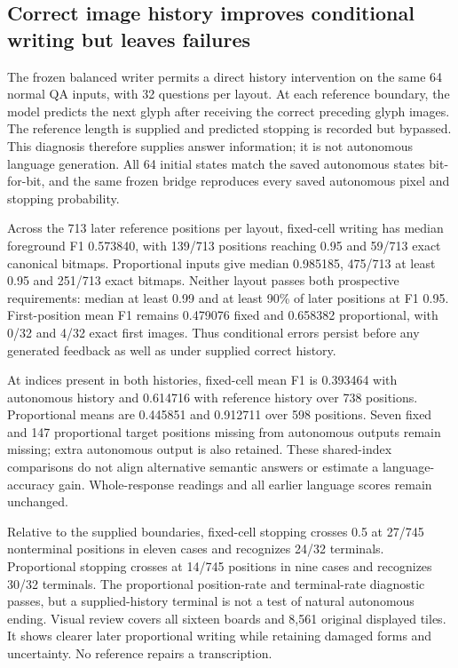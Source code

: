 \documentclass[12pt,a4paper]{article}
\providecommand{\DIFadd}[1]{{\protect\color{blue} \sf #1}} %
\begin{document}
\subsection*{\DIFadd{Correct image history improves conditional writing but leaves failures}}
\DIFadd{The frozen balanced writer permits a direct history intervention on the same
64 normal QA inputs, with 32 questions per layout. At each reference boundary,
the model predicts the next glyph after receiving the correct preceding glyph
images. The reference length is supplied and predicted stopping is recorded
but bypassed. This diagnosis therefore supplies answer information; it is not
autonomous language generation. All 64 initial states match the saved autonomous
states bit-for-bit, and the same frozen bridge reproduces every saved autonomous
pixel and stopping probability.
}

\DIFadd{Across the 713 later reference positions per layout, fixed-cell writing has
median foreground F1 0.573840, with 139/713 positions reaching 0.95 and 59/713
exact canonical bitmaps. Proportional inputs give median 0.985185, 475/713 at
least 0.95 and 251/713 exact bitmaps. Neither layout passes both prospective
requirements: median at least 0.99 and at least 90\% of later positions at F1
0.95. First-position mean F1 remains 0.479076 fixed and 0.658382 proportional,
with 0/32 and 4/32 exact first images. Thus conditional errors persist before
any generated feedback as well as under supplied correct history.
}

\DIFadd{At indices present in both histories, fixed-cell mean F1 is 0.393464 with
autonomous history and 0.614716 with reference history over 738 positions.
Proportional means are 0.445851 and 0.912711 over 598 positions. Seven fixed and
147 proportional target positions missing from autonomous outputs remain
missing; extra autonomous output is also retained. These shared-index comparisons
do not align alternative semantic answers or estimate a language-accuracy gain.
Whole-response readings and all earlier language scores remain unchanged.
}

\DIFadd{Relative to the supplied boundaries, fixed-cell stopping crosses 0.5 at 27/745
nonterminal positions in eleven cases and recognizes 24/32 terminals.
Proportional stopping crosses at 14/745 positions in nine cases and recognizes
30/32 terminals. The proportional position-rate and terminal-rate diagnostic
passes, but a supplied-history terminal is not a test of natural autonomous
ending. Visual review covers all sixteen boards and 8,561 original displayed
tiles. It shows clearer later proportional writing while retaining damaged
forms and uncertainty. No reference repairs a transcription.
}
\end{document}
